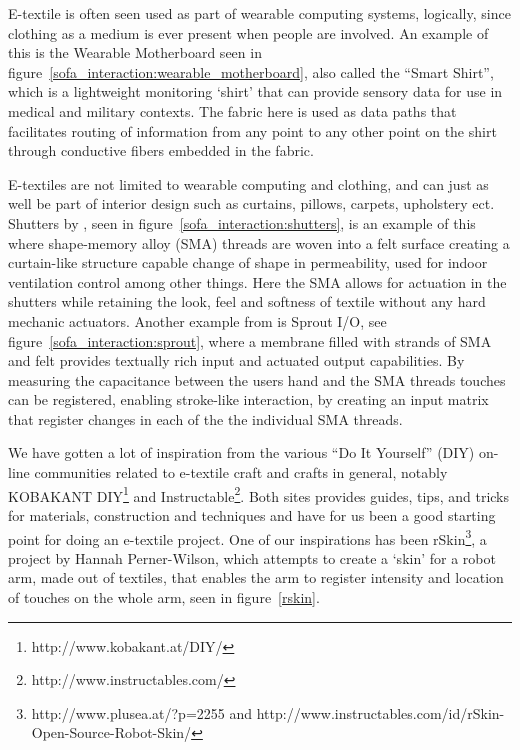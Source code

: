 E-textile is often seen used as part of wearable computing systems, logically, since clothing as a medium is ever present when people are involved.
An example of this is the Wearable Motherboard \citep{gopalsamy1999wearable} seen in figure~\ref{sofa_interaction:wearable_motherboard}, also called the ``Smart Shirt'', which is a lightweight monitoring `shirt' that can provide sensory data for use in medical and military contexts.
The fabric here is used as data paths that facilitates routing of information from any point to any other point on the shirt through conductive fibers embedded in the fabric.

E-textiles are not limited to wearable computing and clothing, and can just as well be part of interior design such as curtains, pillows, carpets, upholstery ect.
Shutters by \citet{coelho2009shutters}, seen in figure~\ref{sofa_interaction:shutters}, is an example of this where shape-memory alloy (SMA) threads are woven into a felt surface creating a curtain-like structure capable change of shape in permeability, used for indoor ventilation control among other things.
Here the SMA allows for actuation in the shutters while retaining the look, feel and softness of textile without any hard mechanic actuators.  
Another example from \citet{coelho2008sprout} is Sprout I/O, see figure~\ref{sofa_interaction:sprout}, where a membrane filled with strands of SMA and felt provides textually rich input and actuated output capabilities.
By measuring the capacitance between the users hand and the SMA threads touches can be registered, enabling stroke-like interaction, by creating an input matrix that register changes in each of the the individual SMA threads.

We have gotten a lot of inspiration from the various ``Do It Yourself'' (DIY) on-line communities related to e-textile craft and crafts in general, notably KOBAKANT DIY\footnote{http://www.kobakant.at/DIY/} and Instructable\footnote{http://www.instructables.com/}.
Both sites provides guides, tips, and tricks for materials, construction and techniques and have for us been a good starting point for doing an e-textile project.
One of our inspirations has been rSkin\footnote{http://www.plusea.at/?p=2255 and http://www.instructables.com/id/rSkin-Open-Source-Robot-Skin/}, a project by Hannah Perner-Wilson, which attempts to create a `skin' for a robot arm, made out of textiles, that enables the arm to register intensity and location of touches on the whole arm, seen in figure~\ref{rskin}.

